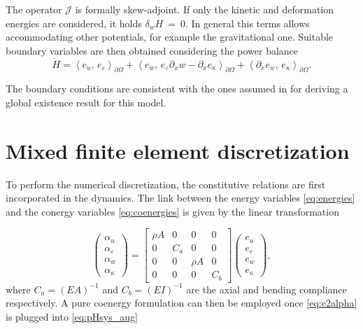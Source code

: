 \documentclass{ifacconf}
\newcommand{\inner}[3][]{\ensuremath{\left\langle #2, \, #3 \right\rangle_{#1}}}
\begin{document}
The operator $\mathcal{J}$ is formally skew-adjoint. If only the kinetic and deformation energies are considered, it holds $\delta_{w} H~=~0$. In general this terms allows accommodating other potentials, for example the gravitational one. Suitable boundary variables are then obtained considering the power balance
\begin{equation}
	\dot{H} = \inner[\partial\Omega]{e_u}{e_\varepsilon} + \inner[\partial\Omega]{e_w}{e_\varepsilon \partial_x w -\partial_x e_\kappa} + \inner[\partial\Omega]{\partial_x e_w}{e_\kappa}.
\end{equation}

The boundary conditions are consistent with the ones assumed in \cite{puel1996} for deriving a global existence result for this model.


\section{Mixed finite element discretization}\label{sec:mfem}
To perform the numerical discretization, the constitutive relations are first incorporated in the dynamics. The link between the energy variables \eqref{eq:energies} and the conergy variables \eqref{eq:coenergies} is given by the linear transformation

\begin{equation}\label{eq:e2alpha}
	\begin{pmatrix}
		\alpha_u \\ \alpha_\varepsilon \\ \alpha_w \\ \alpha_\kappa
	\end{pmatrix} =
	\begin{bmatrix}
	\rho A & 0 & 0 & 0 \\
	0 & C_a & 0 & 0 \\
	0 & 0 & \rho A & 0 \\
	0 & 0 & 0 & C_b
	\end{bmatrix}
	\begin{pmatrix}
		e_u \\ e_\varepsilon \\ e_w \\ e_{\kappa}
	\end{pmatrix},
\end{equation}
where $C_a = (EA)^{-1}$ and $C_b = (EI)^{-1}$ are the axial and bending compliance respectively. A pure coenergy formulation can then be employed once \eqref{eq:e2alpha} is plugged into \eqref{eq:pHsys_aug}
\end{document}
